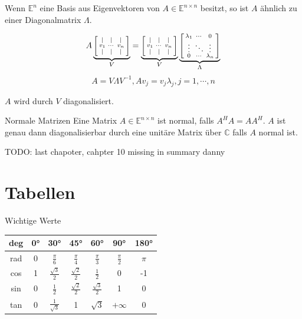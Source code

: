 \documentclass[a4paper,10pt]{article}
\def\C{\mathbb{C}}
\def\E{\mathbb{E}}
\begin{document}
Wenn $\E^n$ eine Basis aus Eigenvektoren von $A \in \E^{n \times n}$ besitzt, so ist $A$ ähnlich zu einer Diagonalmatrix $\Lambda$.

$$A \underbrace{\begin{bsmallmatrix}
  \vert & \vert & \vert \\
  v_1   & \cdots & v_n   \\
  \vert & \vert & \vert
\end{bsmallmatrix}}_V = \underbrace{\begin{bsmallmatrix}
  \vert & \vert & \vert \\
  v_1   & \cdots & v_n   \\
  \vert & \vert & \vert
\end{bsmallmatrix}}_V \underbrace{\begin{bsmallmatrix}
  \lambda_1 & \cdots & 0 \\
  \vdots & \ddots & \vdots \\
  0 & \cdots & \lambda_n
\end{bsmallmatrix}}_\Lambda$$ $$ A = V \Lambda V^{-1}, Av_j = v_j \lambda_j, j = 1, \cdots, n$$

$A$ wird durch $V$ diagonalisiert.

\begin{subbox}{Normale Matrizen}
  Eine Matrix $A \in \E^{n \times n}$ ist normal, falls $A^H A = A A^H$. $A$ ist genau dann diagonalisierbar durch eine unitäre Matrix über $\C$ falls $A$ normal ist. 
\end{subbox}

TODO: last chapoter, cahpter 10 missing in summary danny

\section{Tabellen}

\begin{mainbox}{Wichtige Werte}
  \begin{center} 
   \begin{tabular}{c|cccccc}
    deg & 0° & 30° & 45° & 60° & 90° & 180° \\
    \midrule
    rad & 0 & $\frac{\pi}{6}$ & $\frac{\pi}{4}$ & $\frac{\pi}{3}$ & $\frac{\pi}{2}$ & $\pi$ \\
    cos & 1 & $\frac{\sqrt{3}}{2}$ & $\frac{\sqrt{2}}{2}$ & $\frac{1}{2}$ & 0 & -1 \\
    sin & 0 & $\frac{1}{2}$ & $\frac{\sqrt{2}}{2}$ & $\frac{\sqrt{3}}{2}$ & 1 & 0 \\
    tan & 0 & $\frac{1}{\sqrt{3}}$ & 1 & $\sqrt{3}$ & $+\infty$ & 0 \\
   \end{tabular}
  \end{center}
\end{mainbox}
\end{document}

